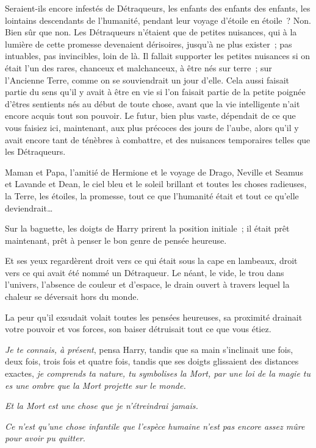 Seraient-ils encore infestés de Détraqueurs, les enfants des enfants des enfants, les lointains descendants de l'humanité, pendant leur voyage d'étoile en étoile~? Non. Bien sûr que non. Les Détraqueurs n'étaient que de petites nuisances, qui à la lumière de cette promesse devenaient dérisoires, jusqu'à ne plus exister~; pas intuables, pas invincibles, loin de là. Il fallait supporter les petites nuisances si on était l'un des rares, chanceux et malchanceux, à être nés sur terre~; sur l'Ancienne Terre, comme on se souviendrait un jour d'elle. Cela aussi faisait partie du sens qu'il y avait à être en vie si l'on faisait partie de la petite poignée d'êtres sentients nés au début de toute chose, avant que la vie intelligente n'ait encore acquis tout son pouvoir. Le futur, bien plus vaste, dépendait de ce que vous faisiez ici, maintenant, aux plus précoces des jours de l'aube, alors qu'il y avait encore tant de ténèbres à combattre, et des nuisances temporaires telles que les Détraqueurs.

Maman et Papa, l'amitié de Hermione et le voyage de Drago, Neville et Seamus et Lavande et Dean, le ciel bleu et le soleil brillant et toutes les choses radieuses, la Terre, les étoiles, la promesse, tout ce que l'humanité était et tout ce qu'elle deviendrait…

Sur la baguette, les doigts de Harry prirent la position initiale~; il était prêt maintenant, prêt à penser le bon genre de pensée heureuse.

Et ses yeux regardèrent droit vers ce qui était sous la cape en lambeaux, droit vers ce qui avait été nommé un Détraqueur. Le néant, le vide, le trou dans l'univers, l'absence de couleur et d'espace, le drain ouvert à travers lequel la chaleur se déversait hors du monde.

La peur qu'il exsudait volait toutes les pensées heureuses, sa proximité drainait votre pouvoir et vos forces, son baiser détruisait tout ce que vous étiez.

\emph{Je te connais, à présent}, pensa Harry, tandis que sa main s'inclinait une fois, deux fois, trois fois et quatre fois, tandis que ses doigts glissaient des distances exactes, \emph{je comprends ta nature, tu symbolises la Mort, par une loi de la magie tu es une ombre que la Mort projette sur le monde.}

\emph{Et la Mort est une chose que je n'étreindrai jamais.}

\emph{Ce n'est qu'une chose infantile que l'espèce humaine n'est pas encore assez mûre pour avoir pu quitter.}

